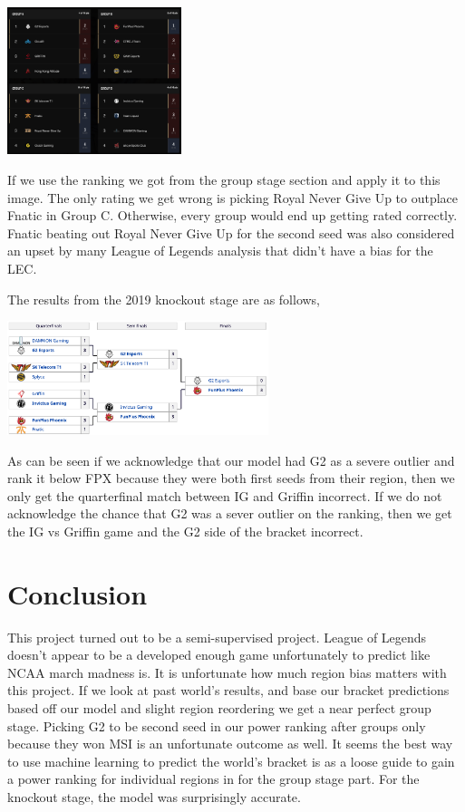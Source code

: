 \documentclass[11pt]{article}
\theoremstyle{plain}
\theoremstyle{definition}
\numberwithin{equation}{section}
\numberwithin{theorem}{section}
\numberwithin{lemma}{section}
\numberwithin{definition}{section}
\numberwithin{proposition}{section}
\numberwithin{corollary}{section}
\begin{document}
	 \begin{center}
	 	\includegraphics[width=2in]{MyPicks}
	 \end{center}
 
 	If we use the ranking we got from the group stage section and apply it to this image. The only rating we get wrong is picking Royal Never Give Up to outplace Fnatic in Group C. Otherwise, every group would end up getting rated correctly. Fnatic beating out Royal Never Give Up for the second seed was also considered an upset by many League of Legends analysis that didn't have a bias for the LEC.
 	
 	
 	The results from the 2019 knockout stage are as follows, 
 	\begin{center}
 		\includegraphics[width=3in]{Knockout}
 	\end{center}
 	
 	As can be seen if we acknowledge that our model had G2 as a severe outlier and rank it below FPX because they were both first seeds from their region, then we only get the quarterfinal match between IG and Griffin incorrect. If we do not acknowledge the chance that G2 was a sever outlier on the ranking, then we get the IG vs Griffin game and the G2 side of the bracket incorrect.

\section{Conclusion}
	This project turned out to be a semi-supervised project. League of Legends doesn't appear to be a developed enough game unfortunately to predict like NCAA march madness is. It is unfortunate how much region bias matters with this project. If we look at past world's results, and base our bracket predictions based off our model and slight region reordering we get a near perfect group stage. Picking G2 to be second seed in our power ranking after groups only because they won MSI is an unfortunate outcome as well. It seems the best way to use machine learning to predict the world's bracket is as a loose guide to gain a power ranking for individual regions in for the group stage part. For the knockout stage, the model was surprisingly accurate.
	
\end{document}
